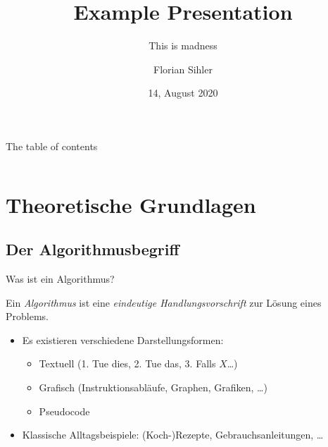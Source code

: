 \documentclass[aspectratio=169,usepdftitle=true,t]{beamer}
\title{Example Presentation}
\subtitle{This is madness}
\institute{Cute-Dispute-Institute \(\circ\) University Ulm}
\date{14, August 2020}
\author{Florian Sihler}
\newcommand\twosplit[3][t]{%
    \begin{columns}[#1]
    \begin{column}{0.475\linewidth}
        #2
    \end{column}\hfill
    \begin{column}{0.475\linewidth}
        #3
    \end{column}
    \end{columns}
}
\begin{document}
\begin{frame}[c]{The table of contents}
    \begin{center}
        \twosplit{\tableofcontents[sections={1-2}]}
            {\tableofcontents[sections={3-4}]}
    \end{center}
\end{frame}


\section{Theoretische Grundlagen}
\subsection{Der Algorithmusbegriff}
\begin{frame}{Was ist ein Algorithmus?}
    \begin{definition}[Algorithmus]
        Ein \emph{Algorithmus} ist eine \emph{eindeutige Handlungsvorschrift} zur Lösung eines Problems.
    \end{definition}
    \begin{itemize}
        \item Es existieren verschiedene Darstellungsformen: \begin{itemize}
            \item Textuell (1. Tue dies, 2. Tue das, 3. Falls \(X\)\ldots)
            \item Grafisch (Instruktionsabläufe, Graphen, Grafiken, \ldots)
            \item Pseudocode
        \end{itemize}
        \item Klassische Alltagsbeispiele: (Koch-)Rezepte, Gebrauchsanleitungen, \ldots
    \end{itemize}
\end{frame}
\end{document}
